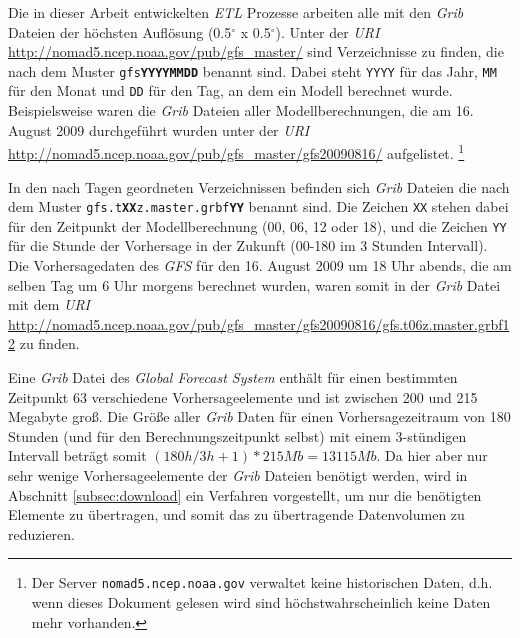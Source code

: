 Die in dieser Arbeit entwickelten \textit{ETL} Prozesse arbeiten alle
mit den \textit{Grib} Dateien der höchsten Auflösung
(0.5$^{\circ}$ x 0.5$^{\circ}$). Unter der \textit{URI}
\url{http://nomad5.ncep.noaa.gov/pub/gfs_master/} sind Verzeichnisse
zu finden, die nach dem Muster \texttt{gfs\textbf{YYYYMMDD}} benannt
sind. Dabei steht \texttt{YYYY} für das Jahr, \texttt{MM} für den
Monat und \texttt{DD} für den Tag, an dem ein Modell berechnet
wurde. Beispielsweise waren die \textit{Grib} Dateien aller
Modellberechnungen, die am 16. August 2009 durchgeführt wurden unter
der \textit{URI}
\url{http://nomad5.ncep.noaa.gov/pub/gfs_master/gfs20090816/}
aufgelistet.  \footnote{Der Server \texttt{nomad5.ncep.noaa.gov}
  verwaltet keine historischen Daten, d.h. wenn dieses Dokument
  gelesen wird sind höchstwahrscheinlich keine Daten mehr vorhanden.}

In den nach Tagen geordneten Verzeichnissen befinden sich
\textit{Grib} Dateien die nach dem Muster
\texttt{gfs.t\textbf{XX}z.master.grbf\textbf{YY}} benannt sind. Die
Zeichen \texttt{XX} stehen dabei für den Zeitpunkt der
Modellberechnung (00, 06, 12 oder 18), und die Zeichen \texttt{YY} für
die Stunde der Vorhersage in der Zukunft (00-180 im 3 Stunden
Intervall). Die Vorhersagedaten des \textit{GFS} für den 16. August
2009 um 18 Uhr abends, die am selben Tag um 6 Uhr morgens berechnet
wurden, waren somit in der \textit{Grib} Datei mit dem \textit{URI}
\url{http://nomad5.ncep.noaa.gov/pub/gfs_master/gfs20090816/gfs.t06z.master.grbf12}
zu finden.

Eine \textit{Grib} Datei des \textit{Global Forecast System} enthält
für einen bestimmten Zeitpunkt 63 verschiedene Vorhersageelemente und
ist zwischen 200 und 215 Megabyte groß. Die Größe aller \textit{Grib}
Daten für einen Vorhersagezeitraum von 180 Stunden (und für den
Berechnungszeitpunkt selbst) mit einem 3-stündigen Intervall beträgt
somit $(180h / 3h + 1) * 215 Mb = 13115 Mb$. Da hier aber nur sehr
wenige Vorhersageelemente der \textit{Grib} Dateien benötigt werden,
wird in Abschnitt \ref{subsec:download} ein Verfahren vorgestellt, um
nur die benötigten Elemente zu übertragen, und somit das zu
übertragende Datenvolumen zu reduzieren.

